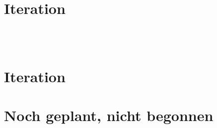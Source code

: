 \documentclass
[english,accentcolor=tud1c]
{tudreport}
\begin{document}
	\chapter{Iteration}
	\\
	\\



	\chapter{Iteration}



\chapter*{Noch geplant, nicht begonnen}

	\\
\end{document}
